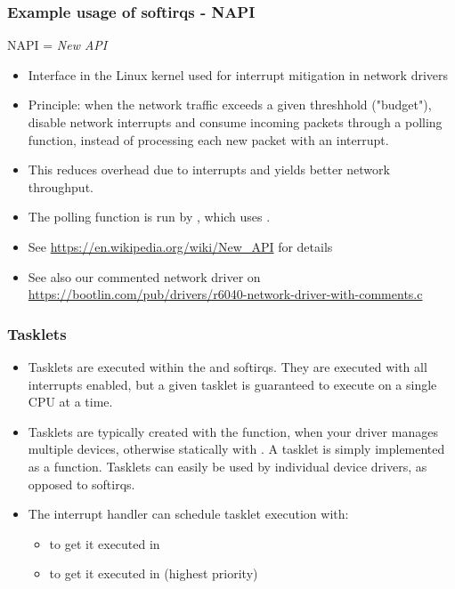 \begin{frame}
  \frametitle{Example usage of softirqs - NAPI}
  NAPI = {\em New API}
  \begin{itemize}
  \item Interface in the Linux kernel used for interrupt mitigation in
        network drivers
  \item Principle: when the network traffic exceeds a given threshhold
        ("budget"), disable network interrupts and consume incoming packets
        through a polling function, instead of processing each new
        packet with an interrupt.
  \item This reduces overhead due to interrupts and yields better
        network throughput.
  \item The polling function is run by , which uses
        .
  \item See \url{https://en.wikipedia.org/wiki/New_API} for details
  \item See also our commented network driver on
        \url{https://bootlin.com/pub/drivers/r6040-network-driver-with-comments.c}
  \end{itemize}

\end{frame}

\begin{frame}
  \frametitle{Tasklets}
  \begin{itemize}
  \item Tasklets are executed within the  and
     softirqs. They are executed with all interrupts enabled, but a
    given tasklet is guaranteed to execute on a single CPU at a time.
  \item Tasklets are typically created with the 
    function, when your driver manages multiple devices, otherwise
    statically with . A tasklet is simply
    implemented as a function. Tasklets can easily
    be used by individual device drivers, as opposed to softirqs.
  \item The interrupt handler can schedule tasklet execution with:
    \begin{itemize}
    \item {} to get it executed in
    \item {} to get it executed in
       (highest priority)
    \end{itemize}
  \end{itemize}
\end{frame}

